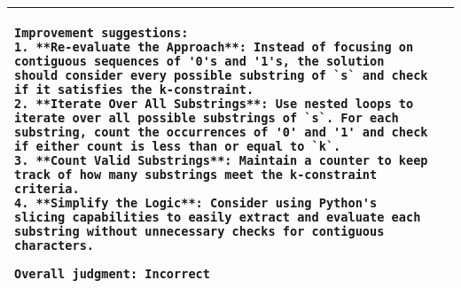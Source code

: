 \begin{table}[]
\begin{longtable}{m{}m{}}
\begin{lstlisting}[frame=none,
    backgroundcolor=\color{white},
    numbers=none,
    xleftmargin=0pt,
    framexleftmargin=0pt,
    framexrightmargin=0pt,
    framextopmargin=0pt,
    framexbottommargin=0pt]
Improvement suggestions:
1. **Re-evaluate the Approach**: Instead of focusing on contiguous sequences of '0's and '1's, the solution should consider every possible substring of `s` and check if it satisfies the k-constraint.
2. **Iterate Over All Substrings**: Use nested loops to iterate over all possible substrings of `s`. For each substring, count the occurrences of '0' and '1' and check if either count is less than or equal to `k`.
3. **Count Valid Substrings**: Maintain a counter to keep track of how many substrings meet the k-constraint criteria.
4. **Simplify the Logic**: Consider using Python's slicing capabilities to easily extract and evaluate each substring without unnecessary checks for contiguous characters.

Overall judgment: Incorrect
\end{lstlisting}
\\ 
\bottomrule
\end{longtable}
\end{table}
